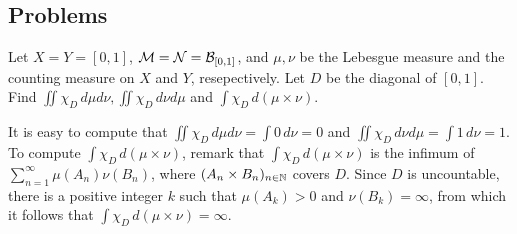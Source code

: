 \subsection*{Problems}

\begin{prob}[Exercise 2.46]
    Let $X=Y=[0, 1]$, ${\mathcal{M}}={\mathcal{N}}={\mathcal{B}}_{[0, 1]}$, and $\mu, \nu$ be the Lebesgue measure and the counting measure on $X$ and $Y$, resepectively.
    Let $D$ be the diagonal of $[0, 1]$.
    Find $\iint \chi_D\,d\mu d\nu, \iint \chi_D\,d\nu d\mu$ and $\int\chi_D\,d(\mu\times\nu)$.
\end{prob}
\begin{sol}
    It is easy to compute that $\iint \chi_D\,d\mu d\nu=\int0\,d\nu=0$ and $\iint \chi_D\,d\nu d\mu=\int 1\,d\nu=1$.
    To compute $\int \chi_D\,d(\mu\times\nu)$, remark that $\int\chi_D\, d(\mu\times\nu)$ is the infimum of $\sum_{n=1}^\infty\mu(A_n)\nu(B_n)$, where $(A_n\times B_n)_{n\in{\mathbb{N}}}$ covers $D$.
    Since $D$ is uncountable, there is a positive integer $k$ such that $\mu(A_k)>0$ and $\nu(B_k)=\infty$, from which it follows that $\int \chi_D\,d(\mu\times\nu)=\infty$.
\end{sol}